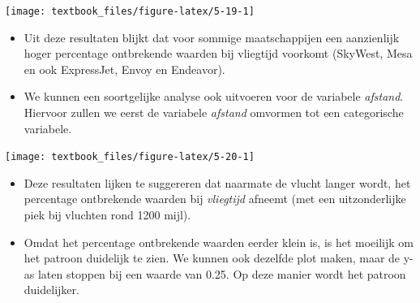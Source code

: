 \documentclass[]{tufte-book}
\newenvironment{Shaded}{}{}
\newcommand{\DataTypeTok}[1]{\textcolor[rgb]{0.56,0.13,0.00}{#1}}
\newcommand{\DecValTok}[1]{\textcolor[rgb]{0.25,0.63,0.44}{#1}}
\newcommand{\KeywordTok}[1]{\textcolor[rgb]{0.00,0.44,0.13}{\textbf{#1}}}
\newcommand{\NormalTok}[1]{#1}
\newcommand{\OperatorTok}[1]{\textcolor[rgb]{0.40,0.40,0.40}{#1}}
\newcommand{\StringTok}[1]{\textcolor[rgb]{0.25,0.44,0.63}{#1}}
\providecommand{\tightlist}{%
  \setlength{\itemsep}{0pt}\setlength{\parskip}{0pt}}
\begin{document}
\texttt{[image: textbook\_files/figure-latex/5-19-1]}

\begin{itemize}
\tightlist
\item
  Uit deze resultaten blijkt dat voor sommige maatschappijen een aanzienlijk hoger percentage ontbrekende waarden bij vliegtijd voorkomt (SkyWest, Mesa en ook ExpressJet, Envoy en Endeavor).
\item
  We kunnen een soortgelijke analyse ook uitvoeren voor de variabele \emph{afstand}. Hiervoor zullen we eerst de variabele \emph{afstand} omvormen tot een categorische variabele.
\end{itemize}

\begin{Shaded}
\end{Shaded}

\texttt{[image: textbook\_files/figure-latex/5-20-1]}

\begin{itemize}
\tightlist
\item
  Deze resultaten lijken te suggereren dat naarmate de vlucht langer wordt, het percentage ontbrekende waarden bij \emph{vliegtijd} afneemt (met een uitzonderlijke piek bij vluchten rond 1200 mijl).
\item
  Omdat het percentage ontbrekende waarden eerder klein is, is het moeilijk om het patroon duidelijk te zien. We kunnen ook dezelfde plot maken, maar de y-as laten stoppen bij een waarde van 0.25. Op deze manier wordt het patroon duidelijker.
\end{itemize}
\end{document}
